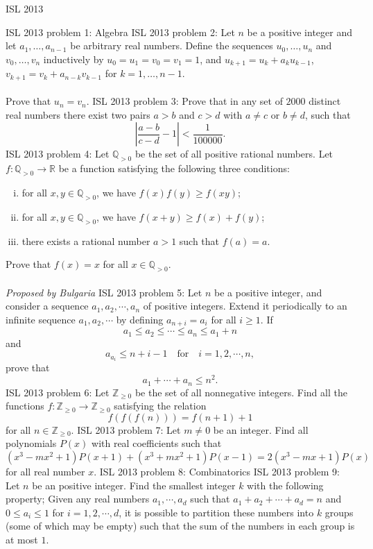 ISL 2013 

ISL 2013 problem 1:  Algebra 
ISL 2013 problem 2:  Let $n$ be a positive integer and let $a_1, \ldots, a_{n-1} $ be arbitrary real numbers. Define the sequences $u_0, \ldots, u_n $ and $v_0, \ldots, v_n $ inductively by $u_0 = u_1  = v_0 = v_1 = 1$, and $u_{k+1} = u_k + a_k u_{k-1}$, $v_{k+1} = v_k + a_{n-k} v_{k-1}$ for $k=1, \ldots, n-1.$ \\\\
Prove that $u_n = v_n.$ 
ISL 2013 problem 3:  Prove that in any set of $2000$ distinct real numbers there exist two pairs $a>b$ and $c>d$ with $a \neq c$ or $b \neq d $, such that
\[ \left| \frac{a-b}{c-d} - 1 \right|< \frac{1}{100000}. \] 
ISL 2013 problem 4:  Let $\mathbb Q_{>0}$ be the set of all positive rational numbers. Let $f:\mathbb Q_{>0}\to\mathbb R$ be a function satisfying the following three conditions:
\begin{enumerate}[(i)]
  \item for all $x,y\in\mathbb Q_{>0}$, we have $f(x)f(y)\geq f(xy)$;
  \item for all $x,y\in\mathbb Q_{>0}$, we have $f(x+y)\geq f(x)+f(y)$;
  \item there exists a rational number $a>1$ such that $f(a)=a$.
\end{enumerate}
Prove that $f(x)=x$ for all $x\in\mathbb Q_{>0}$. \\\\
\textit{Proposed by Bulgaria} 
ISL 2013 problem 5:  Let $n$ be a positive integer, and consider a sequence $a_1 , a_2 , \cdots , a_n $ of positive integers. Extend it periodically to an infinite sequence $a_1 , a_2 , \cdots $ by defining $a_{n+i} = a_i $ for all $i \ge 1$. If
\[ a_1 \le a_2 \le \cdots \le a_n \le a_1 +n \]
and
\[ a_{a_i } \le n+i-1 \quad\text{for}\quad i=1,2,\cdots, n, \]
prove that
\[ a_1 + \cdots +a_n \le n^2. \] 
ISL 2013 problem 6:  Let $\mathbb{Z}_{\ge 0}$ be the set of all nonnegative integers. Find all the functions $f: \mathbb{Z}_{\ge 0} \rightarrow \mathbb{Z}_{\ge 0} $ satisfying the relation
\[ f(f(f(n))) = f(n+1 ) +1 \]
for all $ n\in \mathbb{Z}_{\ge 0}$. 
ISL 2013 problem 7:  Let $m \neq 0 $ be an integer. Find all polynomials $P(x) $ with real coefficients such that
\[ (x^3 - mx^2 +1 ) P(x+1)  + (x^3+mx^2+1) P(x-1) =2(x^3 - mx +1 ) P(x) \]
for all real number $x$. 
ISL 2013 problem 8:  Combinatorics 
ISL 2013 problem 9:  Let $n$ be an positive integer. Find the smallest integer $k$ with the following property; Given any real numbers $a_1 , \cdots , a_d $ such that $a_1 + a_2 + \cdots + a_d = n$ and $0 \le a_i \le 1$ for $i=1,2,\cdots ,d$, it is possible to partition these numbers into $k$ groups (some of which may be empty) such that the sum of the numbers in each group is at most $1$. 
